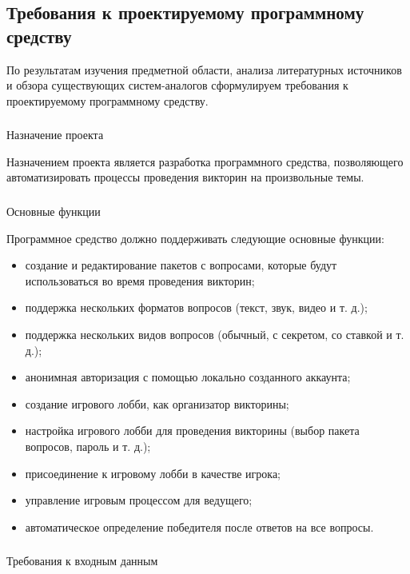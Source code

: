 \subsection{Требования к проектируемому программному средству}
\label{sec:analysis:requirements}

По результатам изучения предметной области, анализа литературных источников и обзора существующих систем-аналогов сформулируем требования к проектируемому программному средству.

\subsubsection{} Назначение проекта
\label{sec:analysis:requirements:designation}

Назначением проекта является разработка программного средства, позволяющего автоматизировать процессы проведения викторин на произвольные темы.

\subsubsection{} Основные функции
\label{sec:analysis:requirements:functions}

Программное средство должно поддерживать следующие основные функции:

\begin{itemize}
	\item создание и редактирование пакетов с вопросами, которые будут использоваться во время проведения викторин;
	\item поддержка нескольких форматов вопросов (текст, звук, видео и т. д.);
	\item поддержка нескольких видов вопросов (обычный, с секретом, со ставкой и т. д.);
	\item анонимная авторизация с помощью локально созданного аккаунта;
	\item создание игрового лобби, как организатор викторины;
	\item настройка игрового лобби для проведения викторины (выбор пакета вопросов, пароль и т. д.);
	\item присоединение к игровому лобби в качестве игрока;
	\item управление игровым процессом для ведущего;
	\item автоматическое определение победителя после ответов на все вопросы.
\end{itemize} 

\subsubsection{} Требования к входным данным
\label{sec:analysis:requirements:input}


